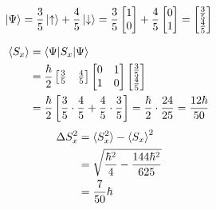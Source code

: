 \documentclass[12pt]{article}
\begin{document}
\begin{equation}
    \begin{split}
        \ket{\Psi} = \frac{3}{5}\ket{\uparrow} + \frac{4}{5}\ket{\downarrow} = \frac{3}{5}\begin{bmatrix} 1 \\ 0 \end{bmatrix} + \frac{4}{5}\begin{bmatrix} 0 \\ 1 \end{bmatrix} = \begin{bmatrix} \frac{3}{5} \\ \frac{4}{5} \end{bmatrix} \\
            \end{split}
\end{equation}

\begin{equation}
    \begin{split}
            \braket{S_x} &= \braket{\Psi|S_x|\Psi} \\
            &= \frac{\hbar}{2}\begin{bmatrix} \frac{3}{5} & \frac{4}{5} \\ \end{bmatrix} \begin{bmatrix} 0 & 1 \\ 1 & 0 \end{bmatrix} \begin{bmatrix} \frac{3}{5} \\ \frac{4}{5} \end{bmatrix} \\
            &= \frac{\hbar}{2}\left[\frac{3}{5}\cdot\frac{4}{5} + \frac{4}{5}\cdot\frac{3}{5}\right] = \frac{\hbar}{2}\cdot\frac{24}{25} = \frac{12\hbar}{50}
    \end{split}
\end{equation}
\begin{equation}
    \begin{split}
        \Delta S_x^2 &= \braket{S_x^2} - \braket{S_x}^2 \\
        &= \sqrt{\frac{\hbar^2}{4} - \frac{144\hbar^2}{625}} \\
        &= \frac{7}{50}\hbar \\
    \end{split}
\end{equation}
\end{document}
